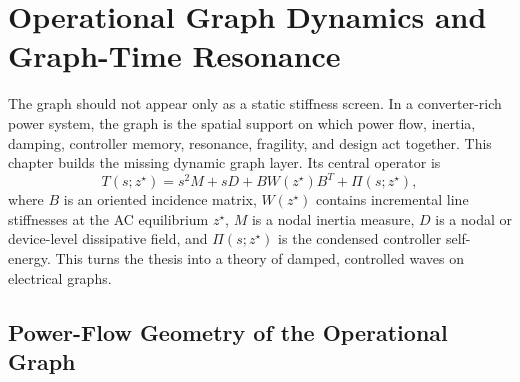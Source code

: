 \chapter{Operational Graph Dynamics and Graph-Time Resonance}

The graph should not appear only as a static stiffness screen. In a
converter-rich power system, the graph is the spatial support on which power
flow, inertia, damping, controller memory, resonance, fragility, and design
act together. This chapter builds the missing dynamic graph layer. Its central
operator is
\begin{equation}
  T(s;z^\star)
  =
  s^2M+sD+B W(z^\star)B^T+\Pi(s;z^\star),
  \label{eq:graph_dynamic_master_operator}
\end{equation}
where \(B\) is an oriented incidence matrix, \(W(z^\star)\) contains
incremental line stiffnesses at the AC equilibrium \(z^\star\), \(M\) is a
nodal inertia measure, \(D\) is a nodal or device-level dissipative field, and
\(\Pi(s;z^\star)\) is the condensed controller self-energy. This turns the
thesis into a theory of damped, controlled waves on electrical graphs.


\section{Power-Flow Geometry of the Operational Graph}


